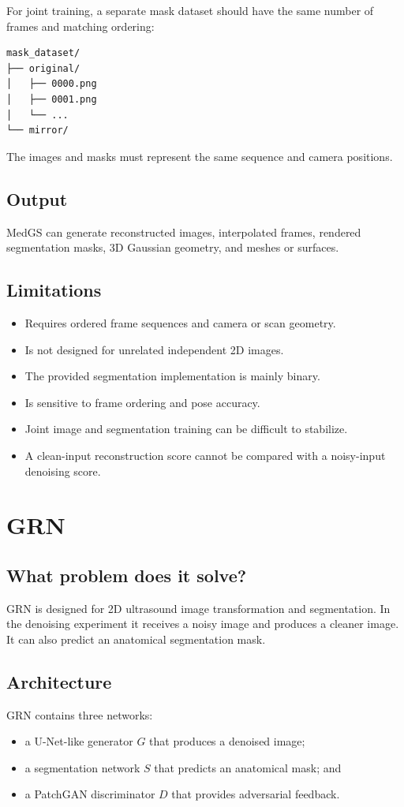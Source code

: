 \documentclass[11pt,a4paper]{article}
\begin{document}
For joint training, a separate mask dataset should have the same number of frames and matching ordering:
\begin{verbatim}
mask_dataset/
├── original/
│   ├── 0000.png
│   ├── 0001.png
│   └── ...
└── mirror/
\end{verbatim}

The images and masks must represent the same sequence and camera positions.

\subsection{Output}
MedGS can generate reconstructed images, interpolated frames, rendered segmentation masks, 3D Gaussian geometry, and meshes or surfaces.

\subsection{Limitations}
\begin{itemize}
    \item Requires ordered frame sequences and camera or scan geometry.
    \item Is not designed for unrelated independent 2D images.
    \item The provided segmentation implementation is mainly binary.
    \item Is sensitive to frame ordering and pose accuracy.
    \item Joint image and segmentation training can be difficult to stabilize.
    \item A clean-input reconstruction score cannot be compared with a noisy-input denoising score.
\end{itemize}

\section{GRN}

\subsection{What problem does it solve?}
GRN is designed for 2D ultrasound image transformation and segmentation. In the denoising experiment it receives a noisy image and produces a cleaner image. It can also predict an anatomical segmentation mask.

\subsection{Architecture}
GRN contains three networks:
\begin{itemize}
    \item a U-Net-like generator $G$ that produces a denoised image;
    \item a segmentation network $S$ that predicts an anatomical mask; and
    \item a PatchGAN discriminator $D$ that provides adversarial feedback.
\end{itemize}
\end{document}
